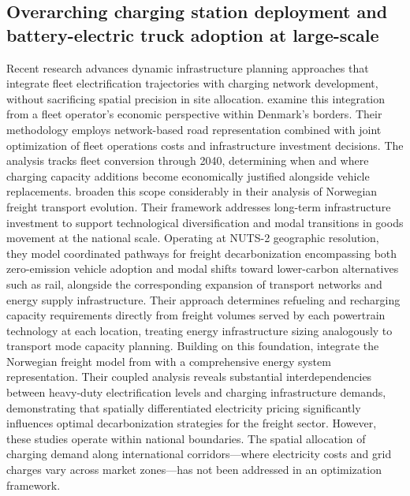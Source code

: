         \subsection{Overarching charging station deployment and battery-electric truck adoption at large-scale}
    Recent research advances dynamic infrastructure planning approaches that integrate fleet electrification trajectories with charging network development, without sacrificing spatial precision in site allocation. \citet{Karam2023} examine this integration from a fleet operator's economic perspective within Denmark's borders. Their methodology employs network-based road representation combined with joint optimization of fleet operations costs and infrastructure investment decisions. The analysis tracks fleet conversion through 2040, determining when and where charging capacity additions become economically justified alongside vehicle replacements.
    \citet{BAKKER2025104076} broaden this scope considerably in their analysis of Norwegian freight transport evolution. Their framework addresses long-term infrastructure investment to support technological diversification and modal transitions in goods movement at the national scale. Operating at NUTS-2 geographic resolution, they model coordinated pathways for freight decarbonization encompassing both zero-emission vehicle adoption and modal shifts toward lower-carbon alternatives such as rail, alongside the corresponding expansion of transport networks and energy supply infrastructure. Their approach determines refueling and recharging capacity requirements directly from freight volumes served by each powertrain technology at each location, treating energy infrastructure sizing analogously to transport mode capacity planning.
Building on this foundation, \citet{PAGNIER2026105114} integrate the Norwegian freight model from \citet{BAKKER2025104076} with a comprehensive energy system representation. Their coupled analysis reveals substantial interdependencies between heavy-duty electrification levels and charging infrastructure demands, demonstrating that spatially differentiated electricity pricing significantly influences optimal decarbonization strategies for the freight sector. However, these studies operate within national boundaries. The spatial allocation of charging demand along international corridors—where electricity costs and grid charges vary across market zones—has not been addressed in an optimization framework.

